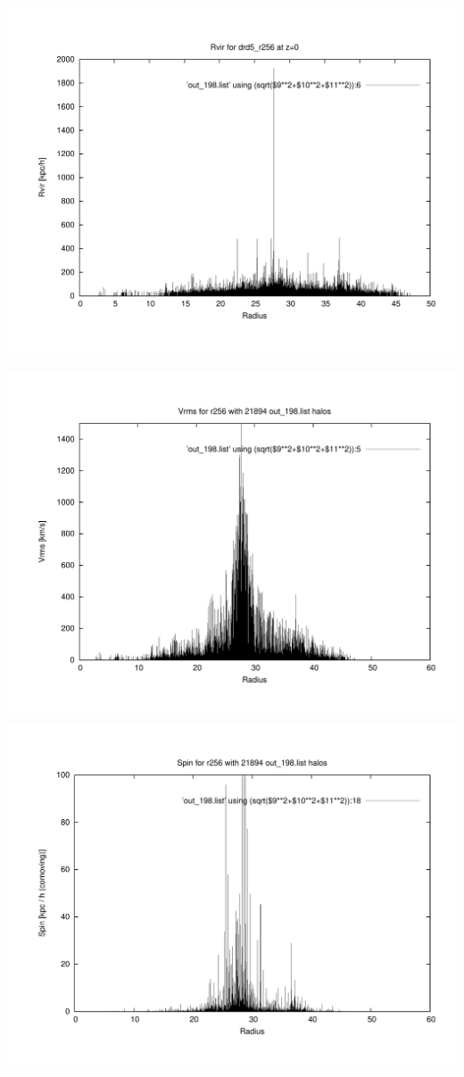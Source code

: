 \includegraphics[scale=0.3]{drd5_r256/plot_rvir_z0.pdf}

\includegraphics[scale=0.3]{drd5_r256/plot_Vrms_out_198.pdf}
\includegraphics[scale=0.3]{drd5_r256/plot_spin_out_198.pdf}


